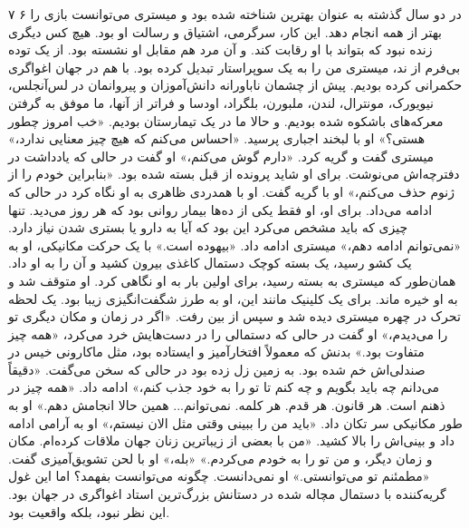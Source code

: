 ۷  
۶  
در دو سال گذشته به عنوان بهترین شناخته شده بود و میستری می‌توانست بازی را بهتر از همه انجام دهد. این کار، سرگرمی، اشتیاق و رسالت او بود.  
هیچ کس دیگری زنده نبود که بتواند با او رقابت کند. و آن مرد هم مقابل او نشسته بود. از یک توده بی‌فرم از ند، میستری من را به یک سوپراستار تبدیل کرده بود. با هم در جهان اغواگری حکمرانی کرده بودیم. پیش از چشمان ناباورانه دانش‌آموزان و پیروانمان در لس‌آنجلس، نیویورک، مونترال، لندن، ملبورن، بلگراد، اودسا و فراتر از آنها، ما موفق به گرفتن معرکه‌های باشکوه شده بودیم.  
و حالا ما در یک تیمارستان بودیم.  
«خب امروز چطور هستی؟» او با لبخند اجباری پرسید.  
«احساس می‌کنم که هیچ چیز معنایی ندارد،» میستری گفت و گریه کرد.  
«دارم گوش می‌کنم،» او گفت در حالی که یادداشت در دفترچه‌اش می‌نوشت. برای او شاید پرونده از قبل بسته شده بود.  
«بنابراین خودم را از ژنوم حذف می‌کنم،» او با گریه گفت.  
او با همدردی ظاهری به او نگاه کرد در حالی که ادامه می‌داد. برای او، او فقط یکی از ده‌ها بیمار روانی بود که هر روز می‌دید. تنها چیزی که باید مشخص می‌کرد این بود که آیا به دارو یا بستری شدن نیاز دارد.  
«نمی‌توانم ادامه دهم،» میستری ادامه داد. «بیهوده است.»  
با یک حرکت مکانیکی، او به یک کشو رسید، یک بسته کوچک دستمال کاغذی بیرون کشید و آن را به او داد. همان‌طور که میستری به بسته رسید، برای اولین بار به او نگاهی کرد. او متوقف شد و به او خیره ماند. برای یک کلینیک مانند این، او به طرز شگفت‌انگیزی زیبا بود.  
یک لحظه تحرک در چهره میستری دیده شد و سپس از بین رفت. «اگر در زمان و مکان دیگری تو را می‌دیدم،» او گفت در حالی که دستمالی را در دست‌هایش خرد می‌کرد، «همه چیز متفاوت بود.»  
بدنش که معمولاً افتخارآمیز و ایستاده بود، مثل ماکارونی خیس در صندلی‌اش خم شده بود. به زمین زل زده بود در حالی که سخن می‌گفت. «دقیقاً می‌دانم چه باید بگویم و چه کنم تا تو را به خود جذب کنم،» ادامه داد. «همه چیز در ذهنم است. هر قانون. هر قدم. هر کلمه. نمی‌توانم... همین حالا انجامش دهم.»  
او به طور مکانیکی سر تکان داد.  
«باید من را ببینی وقتی مثل الان نیستم،» او به آرامی ادامه داد و بینی‌اش را بالا کشید. «من با بعضی از زیباترین زنان جهان ملاقات کرده‌ام. مکان و زمان دیگر، و من تو را به خودم می‌کردم.»  
«بله،» او با لحن تشویق‌آمیزی گفت. «مطمئنم تو می‌توانستی.»  
او نمی‌دانست. چگونه می‌توانست بفهمد؟ اما این غول گریه‌کننده با دستمال مچاله شده در دستانش بزرگ‌ترین استاد اغواگری در جهان بود. این نظر نبود، بلکه واقعیت بود.